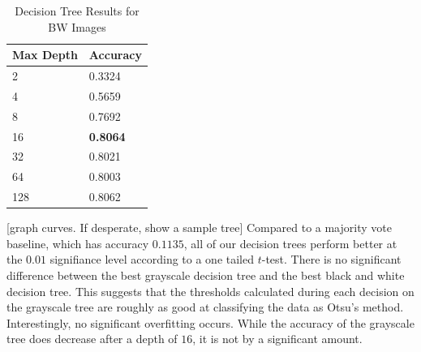 \documentclass[12pt]{article}
\begin{document}
\begin{table}[ht!]
\centering
\caption{Decision Tree  Results for BW Images}
    \begin{tabular}{|l|l|}
    \hline
    Max Depth & Accuracy \\ \hline
    2      & 0.3324   \\ \hline
    4      & 0.5659   \\ \hline
    8      & 0.7692   \\ \hline
    16      & \textbf{0.8064}   \\ \hline
    32     & 0.8021   \\ \hline
	 64     & 0.8003   \\ \hline
   128    & 0.8062   \\ \hline
    \end{tabular}
\end{table}

[graph curves. If desperate, show a sample tree]
Compared to a majority vote baseline, which has accuracy $0.1135$, all of our decision trees perform better at the $0.01$ signifiance level according to a one tailed $t$-test. There is no significant difference between the best grayscale decision tree and the best black and white decision tree. This suggests that the thresholds calculated during each decision on the grayscale tree are roughly as good at classifying the data as Otsu's method. Interestingly, no significant overfitting occurs. While the accuracy of the grayscale tree does decrease after a depth of $16$, it is not by a significant amount.
\end{document}
